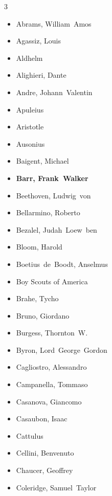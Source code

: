 \documentclass[10pt,makeidx]{extreport}
\begin{document}
\begin{multicols}{3}
	\begin{itemize}
		\item Abrams, William~Amos
		\item Agassiz, Louis
		\item Aldhelm
		\item Alighieri, Dante
		\item Andre, Johann~Valentin
		\item Apuleius
		\item Aristotle
		\item Ausonius
		\item Baigent, Michael
		\item \textbf{Barr, Frank~Walker}
		\item Beethoven, Ludwig~von
		\item Bellarmino, Roberto
		\item Bezalel, Judah~Loew~ben
		\item Bloom, Harold
		\item Boetius~de~Boodt, Anselmus
		\item Boy Scouts of America
		\item Brahe, Tycho
		\item Bruno, Giordano
		\item Burgess, Thornton~W.
		\item Byron, Lord~George~Gordon
		\item Cagliostro, Alessandro
		\item Campanella, Tommaso
		\item Casanova, Giancomo
		\item Casaubon, Isaac
		\item Cattulus
		\item Cellini, Benvenuto
		\item Chaucer, Geoffrey
		\item Coleridge, Samuel~Taylor

\end{itemize}
\end{multicols}
\end{document}
